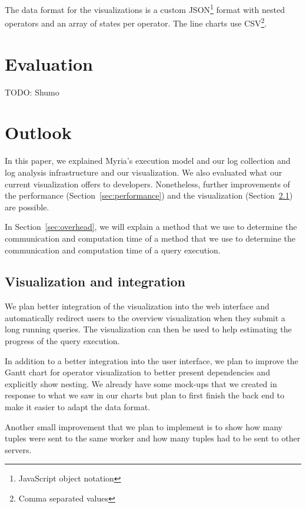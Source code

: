 \documentclass[11pt]{scrartcl}
\begin{document}
The data format for the visualizations is a custom JSON\footnote{JavaScript object notation} format with nested operators and an array of states per operator. The line charts use CSV\footnote{Comma separated values}.


\section{Evaluation}
\label{sec:evaluation}

TODO: Shumo



\section{Outlook}
\label{sec:outlook}

In this paper, we explained Myria's execution model and our log collection and log analysis infrastructure and our visualization. We also evaluated what our current visualization offers to developers. Nonetheless, further improvements of the performance (Section~\ref{sec:performance}) and the visualization (Section~\ref{sec:vizimprovement}) are possible.

In Section~\ref{sec:overhead}, we will explain a method that we use to determine the communication and computation time of a method that we use to determine the communication and computation time of a query execution.


\subsection{Visualization and integration}
\label{sec:vizimprovement}

We plan better integration of the visualization into the web interface and automatically redirect users to the overview visualization when they submit a long running queries. The visualization can then be used to help estimating the progress of the query execution.

In addition to a better integration into the user interface, we plan to improve the Gantt chart for operator visualization to better present dependencies and explicitly show nesting. We already have some mock-ups that we created in response to what we saw in our charts but plan to first finish the back end to make it easier to adapt the data format.

Another small improvement that we plan to implement is to show how many tuples were sent to the same worker and how many tuples had to be sent to other servers.
\end{document}
